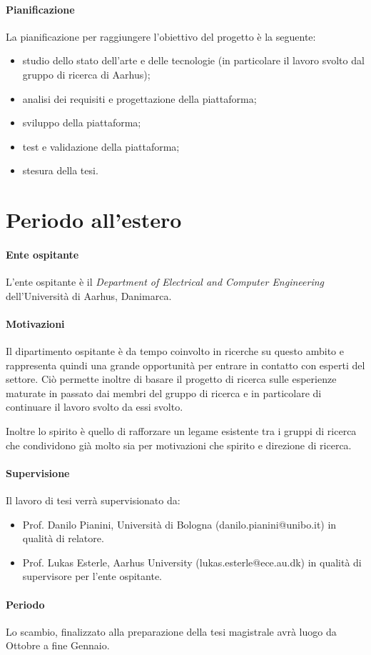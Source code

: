 \documentclass[12pt, a4paper]{article}
\begin{document}
\paragraph{Pianificazione}

La pianificazione per raggiungere l'obiettivo del progetto è la seguente:
\begin{itemize}
    \item studio dello stato dell'arte e delle tecnologie (in particolare il lavoro svolto dal gruppo di ricerca 
    di Aarhus);
    \item analisi dei requisiti e progettazione della piattaforma;
    \item sviluppo della piattaforma;
    \item test e validazione della piattaforma;
    \item stesura della tesi.
\end{itemize}

\section{Periodo all'estero}

\paragraph{Ente ospitante}
L'ente ospitante è il \textit{Department of Electrical and Computer Engineering} dell'Università di Aarhus, Danimarca.

\paragraph{Motivazioni}
Il dipartimento ospitante è da tempo coinvolto in ricerche su questo ambito e rappresenta
quindi una grande opportunità per entrare in contatto con esperti del settore.
Ciò permette inoltre di basare il progetto di ricerca sulle esperienze maturate in passato
dai membri del gruppo di ricerca e in particolare di continuare il lavoro svolto da essi svolto.

Inoltre lo spirito è quello di rafforzare un legame esistente tra i gruppi di ricerca che
condividono già molto sia per motivazioni che spirito e direzione di ricerca.

\paragraph{Supervisione}
Il lavoro di tesi verrà supervisionato da:
\begin{itemize}
    \item Prof. Danilo Pianini, Università di Bologna (danilo.pianini@unibo.it) in qualità di relatore.
    \item Prof. Lukas Esterle, Aarhus University (lukas.esterle@ece.au.dk) in qualità di supervisore per l'ente ospitante.
\end{itemize}

\paragraph{Periodo}
Lo scambio, finalizzato alla preparazione della tesi magistrale avrà luogo da Ottobre a fine Gennaio.
\end{document}
